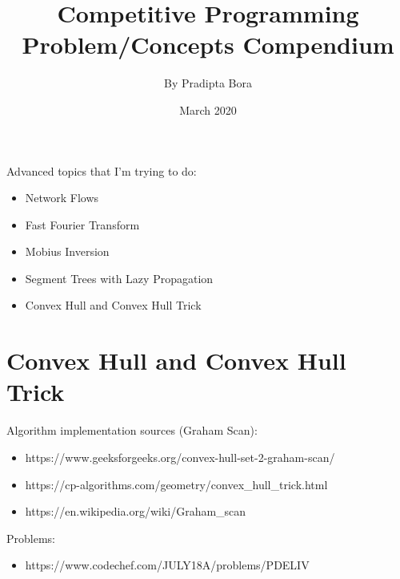 \documentclass[10pt, oneside]{article}
\title{Competitive Programming Problem/Concepts Compendium}
\author{By Pradipta Bora}
\date{March 2020}
\begin{document}
\maketitle

Advanced topics that I'm trying to do:

\begin{itemize}
\item Network Flows
\item Fast Fourier Transform
\item Mobius Inversion
\item Segment Trees with Lazy Propagation
\item Convex Hull and Convex Hull Trick
\end {itemize}

\section{Convex Hull and Convex Hull Trick}
		Algorithm implementation sources (Graham Scan):
		\begin{itemize}
	\item https://www.geeksforgeeks.org/convex-hull-set-2-graham-scan/
	\item https://cp-algorithms.com/geometry/convex_hull_trick.html
	\item https://en.wikipedia.org/wiki/Graham_scan
	\end{itemize}

		Problems:
		\begin{itemize}
			\item https://www.codechef.com/JULY18A/problems/PDELIV
		\end{itemize}
\end{document}

